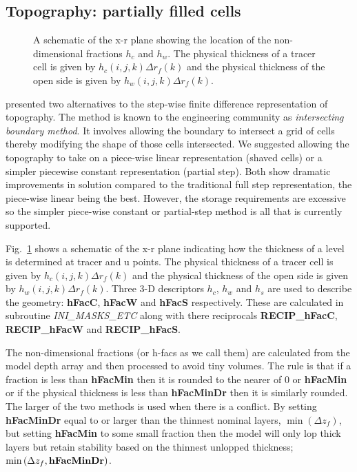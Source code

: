 \subsection{Topography: partially filled cells}

\begin{figure}
\begin{center}
\end{center}
\caption{
A schematic of the x-r plane showing the location of the
non-dimensional fractions $h_c$ and $h_w$. The physical thickness of a
tracer cell is given by $h_c(i,j,k) \Delta r_f(k)$ and the physical
thickness of the open side is given by $h_w(i,j,k) \Delta r_f(k)$.}
\label{fig:hfacs}
\end{figure}

\cite{adcroft:97} presented two alternatives to the step-wise finite
difference representation of topography. The method is known to the
engineering community as {\em intersecting boundary method}. It
involves allowing the boundary to intersect a grid of cells thereby
modifying the shape of those cells intersected. We suggested allowing
the topography to take on a piece-wise linear representation (shaved
cells) or a simpler piecewise constant representation (partial step).
Both show dramatic improvements in solution compared to the
traditional full step representation, the piece-wise linear being the
best. However, the storage requirements are excessive so the simpler
piece-wise constant or partial-step method is all that is currently
supported.

Fig.~\ref{fig:hfacs} shows a schematic of the x-r plane indicating how
the thickness of a level is determined at tracer and u points.
The physical thickness of a tracer cell is given by $h_c(i,j,k) \Delta
r_f(k)$ and the physical thickness of the open side is given by
$h_w(i,j,k) \Delta r_f(k)$. Three 3-D descriptors $h_c$, $h_w$ and
$h_s$ are used to describe the geometry: {\bf hFacC}, {\bf hFacW} and
{\bf hFacS} respectively. These are calculated in subroutine {\em
INI\_MASKS\_ETC} along with there reciprocals {\bf RECIP\_hFacC}, {\bf
RECIP\_hFacW} and {\bf RECIP\_hFacS}.

The non-dimensional fractions (or h-facs as we call them) are
calculated from the model depth array and then processed to avoid tiny
volumes. The rule is that if a fraction is less than {\bf hFacMin}
then it is rounded to the nearer of $0$ or {\bf hFacMin} or if the
physical thickness is less than {\bf hFacMinDr} then it is similarly
rounded. The larger of the two methods is used when there is a
conflict. By setting {\bf hFacMinDr} equal to or larger than the
thinnest nominal layers, $\min{(\Delta z_f)}$, but setting {\bf
hFacMin} to some small fraction then the model will only lop thick
layers but retain stability based on the thinnest unlopped thickness;
$\min{(\Delta z_f,\mbox{\bf hFacMinDr})}$.

